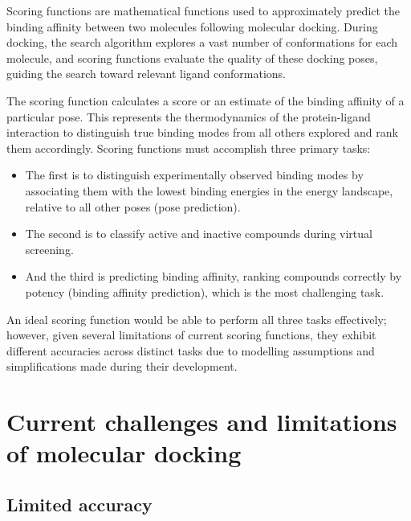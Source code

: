 \documentclass[12pt]{article}
\begin{document}
Scoring functions are mathematical functions\cite{CH1_20} used to approximately predict the binding affinity between two molecules following molecular docking. During docking, the search algorithm explores a vast number of conformations for each molecule, and scoring functions evaluate the quality of these docking poses, guiding the search toward relevant ligand conformations.

The scoring function calculates a score or an estimate of the binding affinity of a particular pose. This represents the thermodynamics of the protein-ligand interaction to distinguish true binding modes from all others explored and rank them accordingly. Scoring functions must accomplish three primary tasks:
\begin{itemize}
\item The first is to distinguish experimentally observed binding modes by associating them with the lowest binding energies in the energy landscape, relative to all other poses (pose prediction). 
\item The second is to classify active and inactive compounds during virtual screening. 
\item And the third is predicting binding affinity, ranking compounds correctly by potency (binding affinity prediction), which is the most challenging task. 
\end{itemize}
An ideal scoring function would be able to perform all three tasks effectively; however, given several limitations of current scoring functions, they exhibit different accuracies across distinct tasks due to modelling assumptions and simplifications made during their development. 

\section{Current challenges and limitations of molecular docking}

\subsection{Limited accuracy}
\end{document}
